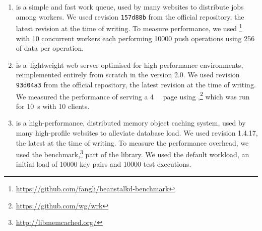 \begin{enumerate}

\item[\beanstalkd\footnote{\url{http://kr.github.io/beanstalkd/}}]
is a simple and fast work queue, used by many websites to distribute jobs among
workers. We used revision \lstinline`157d88b` from the official \git
repository, the latest revision at the time of writing.  To measure
performance, we used
\beanstalkdbenchmark\footnote{\url{https://github.com/fangli/beanstalkd-benchmark}}
with \num{10} concurrent workers each performing \num{10000} push operations
using \SI{256}{\byte} of data per operation.


\item[\lighttpdtwo\footnote{\url{https://github.com/lighttpd/lighttpd2}}]
is a~lightweight web server optimised for high performance environments,
reimplemented entirely from scratch in the version 2.0.  We used revision
\lstinline`93d04a3` from the official \git repository, the latest revision at
the time of writing. We measured the performance of serving a
\SI{4}{\kilo\byte} page using \wrk,\footnote{\url{https://github.com/wg/wrk}}
which was run for \SI{10}{\second} with \num{10} clients.

\item[\memcached\footnote{\url{http://memcached.org/}}]
is a high-performance, distributed memory object caching system, used by
many high-profile websites to alleviate database load. We used 
revision 1.4.17, the latest at the time of writing. To measure the performance
overhead, we used the \memslap
benchmark,\footnote{\url{http://libmemcached.org/}} part of the \libmemcached
library. We used the default workload, \ie an initial load of \num{10000} key
pairs and \num{10000} test executions.



\end{enumerate}
